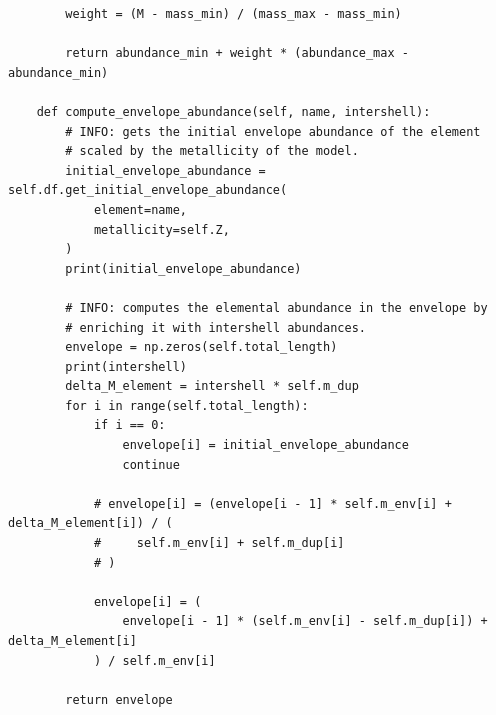 \documentclass[a4paper,10pt]{article}
\begin{document}
\begin{verbatim}
        weight = (M - mass_min) / (mass_max - mass_min)

        return abundance_min + weight * (abundance_max - abundance_min)

    def compute_envelope_abundance(self, name, intershell):
        # INFO: gets the initial envelope abundance of the element
        # scaled by the metallicity of the model.
        initial_envelope_abundance = self.df.get_initial_envelope_abundance(
            element=name,
            metallicity=self.Z,
        )
        print(initial_envelope_abundance)

        # INFO: computes the elemental abundance in the envelope by
        # enriching it with intershell abundances.
        envelope = np.zeros(self.total_length)
        print(intershell)
        delta_M_element = intershell * self.m_dup
        for i in range(self.total_length):
            if i == 0:
                envelope[i] = initial_envelope_abundance
                continue

            # envelope[i] = (envelope[i - 1] * self.m_env[i] + delta_M_element[i]) / (
            #     self.m_env[i] + self.m_dup[i]
            # )

            envelope[i] = (
                envelope[i - 1] * (self.m_env[i] - self.m_dup[i]) + delta_M_element[i]
            ) / self.m_env[i]

        return envelope
\end{verbatim}
\end{document}

